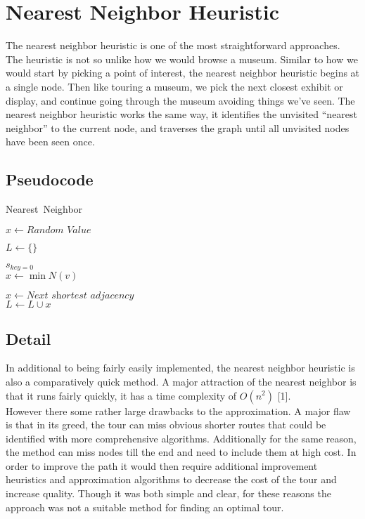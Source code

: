 \documentclass{article}
\begin{document}
\section{Nearest Neighbor Heuristic}

The nearest neighbor heuristic is one of the most straightforward approaches.
The heuristic is not so unlike how we would browse a museum. Similar to how we
would start by picking a point of interest, the nearest neighbor heuristic
begins at a single node. Then like touring a museum, we pick the next closest
exhibit or display, and continue going through the museum avoiding things we’ve
seen. The nearest neighbor heuristic works the same way, it identifies the
unvisited “nearest neighbor” to the current node, and traverses the graph until
all unvisited nodes have been seen once.

\subsection{Pseudocode}

\FloatBarrier

\begin{algorithm}
  \caption{Nearest\ Neighbor}
  \label{alg1}
  \begin{algorithmic}[1]

    \State $x \gets \textit{Random\ Value}$

    \State $L \gets \{\}$

    \State $s_{\textit{key} = 0}$
    \\
        \State $x \gets \min N(v)$

        \Else
          \State $x \gets \textit{Next shortest adjacency}$
        \EndIf
      \EndFor
    \EndWhile
    \\
    \State $L \gets L \cup {x}$
    \EndProcedure
  \end{algorithmic}
\end{algorithm}

\FloatBarrier

\subsection{Detail}
In additional to being fairly easily implemented, the nearest neighbor heuristic
is also a comparatively quick method. A major attraction of the nearest neighbor
is that it runs fairly quickly, it has a time complexity of $O(n^2)$ [1].\\

However there some rather large drawbacks to the approximation. A major flaw is
that in its greed, the tour can miss obvious shorter routes that could be
identified with more comprehensive algorithms. Additionally for the same reason,
the method can miss nodes till the end and need to include them at high cost.
In order to improve the path it would then require additional improvement
heuristics and approximation algorithms to decrease the cost of the tour and
increase quality. Though it was both simple and clear, for these reasons the
approach was not a suitable method for finding an optimal tour.
\end{document}
